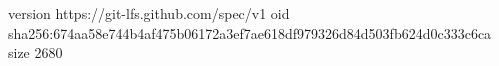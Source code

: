 version https://git-lfs.github.com/spec/v1
oid sha256:674aa58e744b4af475b06172a3ef7ae618df979326d84d503fb624d0c333c6ca
size 2680
